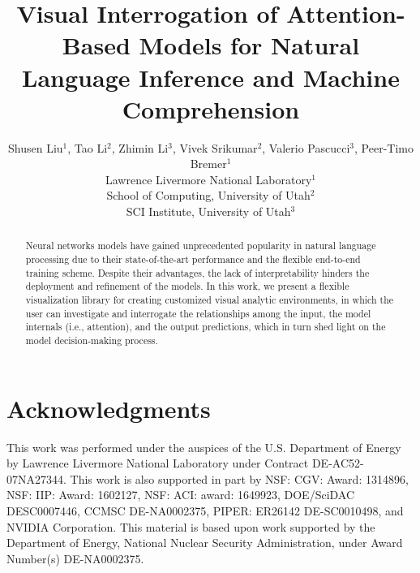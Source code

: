 \documentclass[11pt,a4paper]{article}
\title{Visual Interrogation of Attention-Based Models for Natural Language Inference and Machine Comprehension}
\author{Shusen Liu$^{1}$, Tao Li$^{2}$,  Zhimin Li$^{3}$,  Vivek Srikumar$^{2}$, Valerio Pascucci$^{3}$, Peer-Timo Bremer$^{1}$ \\
  Lawrence Livermore National Laboratory$^{1}$\\
  School of Computing, University of Utah$^{2}$\\  
  SCI Institute, University of Utah$^{3}$\\
}
\begin{document}
\maketitle


\begin{abstract}
Neural networks models have gained unprecedented popularity in natural language processing due to their state-of-the-art performance and the flexible end-to-end training scheme. Despite their advantages, the lack of interpretability hinders the deployment and refinement of the models. In this work, we present a flexible visualization library for creating customized visual analytic environments, in which the user can investigate and interrogate the relationships among the input, the model internals (i.e., attention), and the output predictions, which in turn shed light on the model decision-making process.
\end{abstract}







\section*{Acknowledgments}
This work was performed under the auspices of the U.S. Department of Energy by Lawrence Livermore National Laboratory under Contract DE-AC52-07NA27344. 
This work is also supported in part by NSF: CGV: Award: 1314896, NSF: IIP: Award: 1602127, NSF: ACI: award: 1649923, DOE/SciDAC DESC0007446, CCMSC DE-NA0002375, PIPER: ER26142 DE-SC0010498, and NVIDIA Corporation. This material is based upon work supported by the Department of Energy, National Nuclear Security Administration, under Award Number(s) DE-NA0002375.



\end{document}
